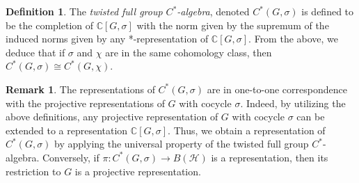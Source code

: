 \documentclass{amsart}
\theoremstyle{definition}
\newtheorem{remark}[theorem]{Remark}
\newtheorem{definition}[theorem]{Definition}
\newcommand{\C}{\mathbb{C}}
\begin{document}
\begin{definition}
The {\em twisted full group $C^*$-algebra}, denoted $C^*(G,\sigma)$ is defined to be the completion of $\C[G,\sigma]$ with the norm given by the supremum of the induced norms given by any *-representation of $\C[G,\sigma]$. From the above, we deduce that if $\sigma$ and $\chi$ are in the same cohomology class, then $C^*(G,\sigma)\cong C^*(G,\chi)$.
\end{definition}
\begin{remark}
The representations of $C^*(G,\sigma)$ are in one-to-one correspondence with the projective representations of $G$ with cocycle $\sigma$. Indeed, by utilizing the above definitions, any projective representation of $G$ with cocycle $\sigma$ can be extended to a representation $\C[G,\sigma]$. Thus, we obtain a representation of $C^*(G,\sigma)$ by applying the universal property of the twisted full group $C^*$-algebra. Conversely, if $\pi \colon C^*(G,\sigma)\to B(\mathcal{H})$ is a representation, then its restriction to $G$ is a projective representation.
\end{remark}
\end{document}
